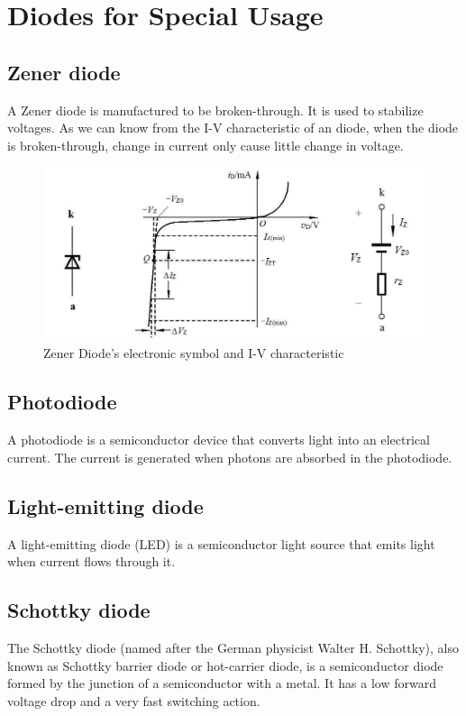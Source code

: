 \section{Diodes for Special Usage}

\subsection{Zener diode}

A Zener diode is manufactured to be broken-through. It is used to stabilize voltages. As we can know from the I-V characteristic of an diode, when the diode is broken-through, change in current only cause little change in voltage.

\begin{figure}[H]
  \centering
  \includegraphics[width=0.5\linewidth]{figures/Zener-diode-1}
  \caption{Zener Diode's electronic symbol and I-V characteristic}
  \label{fig:}
\end{figure}

\subsection{Photodiode}

A photodiode is a semiconductor device that converts light into an electrical current. The current is generated when photons are absorbed in the photodiode.

\subsection{Light-emitting diode}

A light-emitting diode (LED) is a semiconductor light source that emits light when current flows through it.

\subsection{Schottky diode}

The Schottky diode (named after the German physicist Walter H. Schottky), also known as Schottky barrier diode or hot-carrier diode, is a semiconductor diode formed by the junction of a semiconductor with a metal. It has a low forward voltage drop and a very fast switching action.



